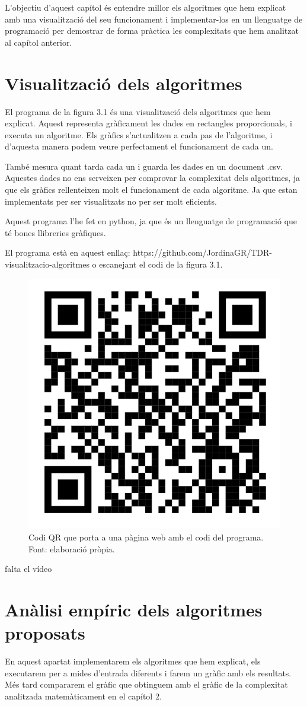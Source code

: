 L'objectiu d'aquest capítol és entendre millor els algoritmes que hem explicat amb una visualització del seu funcionament i implementar-los en un llenguatge de programació per demostrar de forma pràctica les complexitats que hem analitzat al capítol anterior.

\section{Visualització dels algoritmes}
El programa de la figura 3.1 és una visualització dels algoritmes que hem explicat. Aquest representa gràficament les dades en rectangles proporcionals, i executa un algoritme. Els gràfics s'actualitzen a cada pas de l'algoritme, i d'aquesta manera podem veure perfectament el funcionament de cada un. 

També mesura quant tarda cada un i guarda les dades en un document .csv. Aquestes dades no ens serveixen per comprovar la complexitat dels algoritmes, ja que els gràfics rellenteixen molt el funcionament de cada algoritme. Ja que estan implementats per ser visualitzats no per ser molt eficients.

Aquest programa l'he fet en python, ja que és un llenguatge de programació que té bones llibreries gràfiques.

El programa està en aquest enllaç: https://github.com/JordinaGR/TDR-visualitzacio-algoritmes o escanejant el codi de la figura 3.1.

\begin{figure}[H]
    \centering
    \includegraphics[width=.15\textwidth]{capitols/figures/qrviz.png}
    \caption[Codi QR que porta a una pàgina web amb el codi del programa.]{Codi QR que porta a una pàgina web amb el codi del programa. Font: elaboració pròpia.}
    \label{fig:my_label}
\end{figure}

falta el vídeo

\section{Anàlisi empíric dels algoritmes proposats}
En aquest apartat implementarem els algoritmes que hem explicat, els executarem per a mides d'entrada diferents i farem un gràfic amb els resultats. Més tard compararem el gràfic que obtinguem amb el gràfic de la complexitat analitzada matemàticament en el capítol 2.

